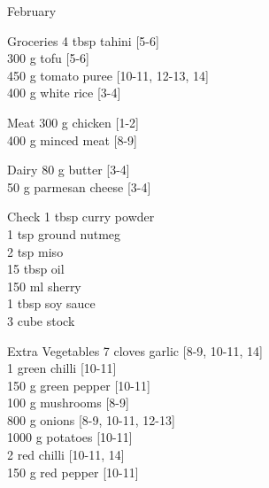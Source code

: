\begin{menu}{February}
\begin{shoppinglist}{Groceries}
      4 tbsp tahini {\scriptsize[5-6]}\\
      300 g tofu {\scriptsize[5-6]}\\
      450 g tomato puree {\scriptsize[10-11, 12-13, 14]}\\
      400 g white rice {\scriptsize[3-4]}\\
      \end{shoppinglist}%
      \par\vfil %
      \begin{shoppinglist}{Meat}
      300 g chicken {\scriptsize[1-2]}\\
      400 g minced meat {\scriptsize[8-9]}\\
      \end{shoppinglist}%
      \begin{shoppinglist}{Dairy}
      80 g butter {\scriptsize[3-4]}\\
      50 g parmesan cheese {\scriptsize[3-4]}\\
      \end{shoppinglist}%
      \par\vfil %
      \vfil\clearpage %
      \begin{shoppinglist}{Check}
      1 tbsp curry powder \\
      1 tsp ground nutmeg \\
      2 tsp miso \\
      15 tbsp oil \\
      150 ml sherry \\
      1 tbsp soy sauce \\
      3 cube stock \\
      \end{shoppinglist}%
      \begin{shoppinglist}{Extra Vegetables}
      7 cloves garlic {\scriptsize[8-9, 10-11, 14]}\\
      1  green chilli {\scriptsize[10-11]}\\
      150 g green pepper {\scriptsize[10-11]}\\
      100 g mushrooms {\scriptsize[8-9]}\\
      800 g onions {\scriptsize[8-9, 10-11, 12-13]}\\
      1000 g potatoes {\scriptsize[10-11]}\\
      2  red chilli {\scriptsize[10-11, 14]}\\
      150 g red pepper {\scriptsize[10-11]}\\
      \end{shoppinglist}%
      \par\vfil %
    \vfil\clearpage
  

\end{menu}
